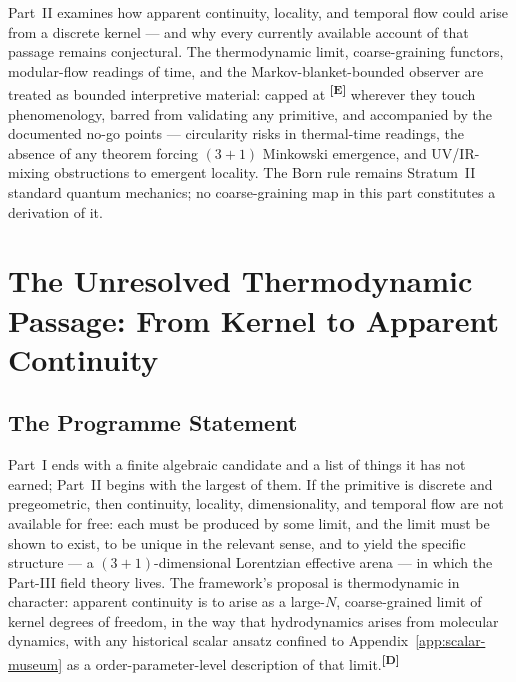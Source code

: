 \documentclass[12pt,a4paper,twoside]{article}
\theoremstyle{plain}
\theoremstyle{definition}
\theoremstyle{remark}
\newcommand{\catmark}[1]{\textsuperscript{\textsf{\textbf{[#1]}}}}
\begin{document}
\noindent Part~II examines how apparent continuity, locality, and temporal
flow could arise from a discrete kernel --- and why every currently
available account of that passage remains conjectural. The thermodynamic
limit, coarse-graining functors, modular-flow readings of time, and the
Markov-blanket-bounded observer are treated as bounded interpretive
material: capped at \catmark{E} wherever they touch phenomenology, barred
from validating any primitive, and accompanied by the documented no-go
points --- circularity risks in thermal-time readings, the absence of any
theorem forcing $(3{+}1)$ Minkowski emergence, and UV/IR-mixing
obstructions to emergent locality. The Born rule remains Stratum~II
standard quantum mechanics; no coarse-graining map in this part
constitutes a derivation of it.



\newpage
\section{The Unresolved Thermodynamic Passage: From Kernel to Apparent Continuity}
\label{sec:thermo-passage}

\subsection{The Programme Statement}
\label{subsec:thermo-programme}

Part~I ends with a finite algebraic candidate and a list of things it has
not earned; Part~II begins with the largest of them. If the primitive is
discrete and pregeometric, then continuity, locality, dimensionality, and
temporal flow are not available for free: each must be produced by some
limit, and the limit must be shown to exist, to be unique in the relevant
sense, and to yield the specific structure --- a $(3{+}1)$-dimensional
Lorentzian effective arena --- in which the Part-III field theory lives.
The framework's proposal is thermodynamic in character: apparent
continuity is to arise as a large-$N$, coarse-grained limit of kernel
degrees of freedom, in the way that hydrodynamics arises from molecular
dynamics, with any historical scalar ansatz confined to Appendix~\ref{app:scalar-museum} as a
order-parameter-level description of that limit.\catmark{D}
\end{document}
